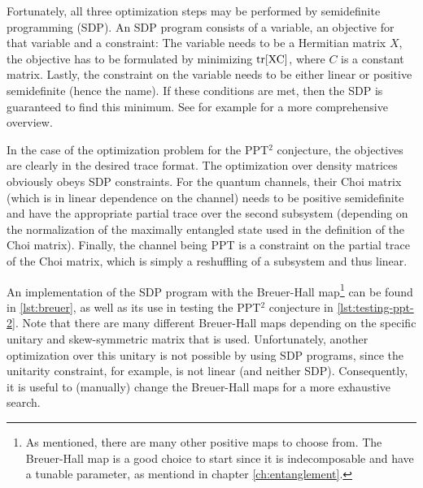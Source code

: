 Fortunately, all three optimization steps may be performed by semidefinite programming (SDP). An SDP program consists of a variable, an objective for that variable and a constraint: The variable needs to be a Hermitian matrix $X$, the objective has to be formulated by minimizing $\mathrm{tr[XC]}$, where $C$ is a constant matrix. Lastly, the constraint on the variable needs to be either linear or positive semidefinite (hence the name). If these conditions are met, then the SDP is guaranteed to find this minimum. See for example \cite{Vandenberghe1996} for a more comprehensive overview.

In the case of the optimization problem for the PPT$^2$ conjecture, the objectives are clearly in the desired trace format. The optimization over density matrices obviously obeys SDP constraints. For the quantum channels, their Choi matrix (which is in linear dependence on the channel) needs to be positive semidefinite and have the appropriate partial trace over the second subsystem (depending on the normalization of the maximally entangled state used in the definition of the Choi matrix). Finally, the channel being PPT is a constraint on the partial trace of the Choi matrix, which is simply a reshuffling of a subsystem and thus linear.

An implementation of the SDP program with the Breuer-Hall map\footnote{As mentioned, there are many other positive maps to choose from. The Breuer-Hall map is a good choice to start since it is indecomposable and have a tunable parameter, as mentiond in chapter \ref{ch:entanglement}.} can be found in \ref{lst:breuer}, as well as its use in testing the PPT$^2$ conjecture in \ref{lst:testing-ppt-2}. Note that there are many different Breuer-Hall maps depending on the specific unitary and skew-symmetric matrix that is used. Unfortunately, another optimization over this unitary is not possible by using SDP programs, since the unitarity constraint, for example, is not linear (and neither SDP). Consequently, it is useful to (manually) change the Breuer-Hall maps for a more exhaustive search.

